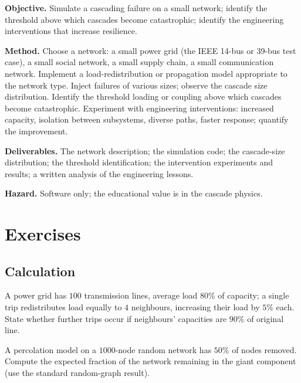 \begin{project}
\textbf{Objective.} Simulate a cascading failure on a small network; identify the threshold above which cascades become catastrophic; identify the engineering interventions that increase resilience.

\textbf{Method.} Choose a network: a small power grid (the IEEE 14-bus or 39-bus test case), a small social network, a small supply chain, a small communication network. Implement a load-redistribution or propagation model appropriate to the network type. Inject failures of various sizes; observe the cascade size distribution. Identify the threshold loading or coupling above which cascades become catastrophic. Experiment with engineering interventions: increased capacity, isolation between subsystems, diverse paths, faster response; quantify the improvement.

\textbf{Deliverables.} The network description; the simulation code; the cascade-size distribution; the threshold identification; the intervention experiments and results; a written analysis of the engineering lessons.

\textbf{Hazard.} Software only; the educational value is in the cascade physics.
\end{project}

\section{Exercises}

\subsection*{Calculation}

\begin{exercise}
A power grid has $100$ transmission lines, average load $80\%$ of capacity; a single trip redistributes load equally to $4$ neighbours, increasing their load by $5\%$ each. State whether further trips occur if neighbours' capacities are $90\%$ of original line.
\end{exercise}

\begin{exercise}
A percolation model on a $1000$-node random network has $50\%$ of nodes removed. Compute the expected fraction of the network remaining in the giant component (use the standard random-graph result).
\end{exercise}

